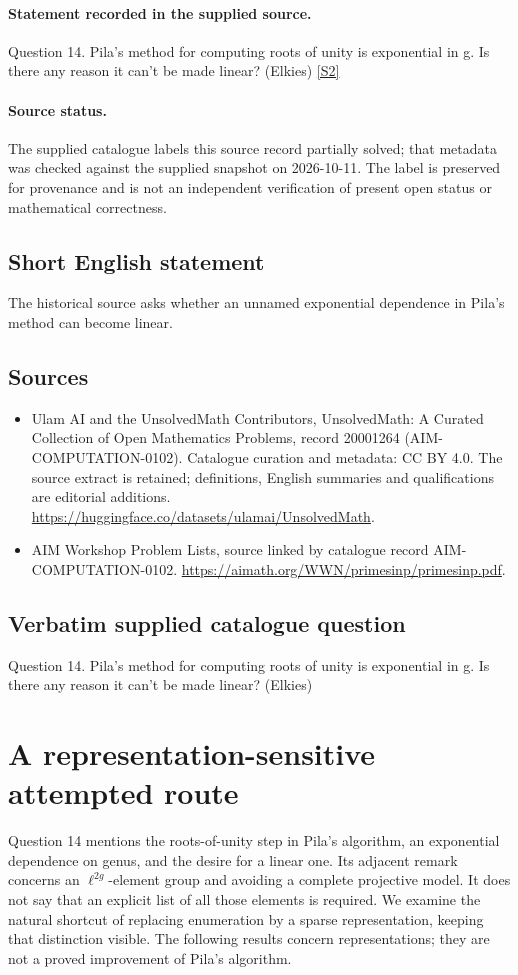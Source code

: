 \documentclass[11pt]{article}
\begin{document}
\paragraph{Statement recorded in the supplied source.}
Question 14. Pila's method for computing roots of unity is exponential in g. Is there any reason it can't be made linear? (Elkies) \href{https://aimath.org/WWN/primesinp/primesinp.pdf}{[S2]}
\paragraph{Source status.}
The supplied catalogue labels this source record partially solved; that metadata was checked against the supplied snapshot on 2026-10-11. The label is preserved for provenance and is not an independent verification of present open status or mathematical correctness.
\subsection{Short English statement}
The historical source asks whether an unnamed exponential dependence in Pila's method can become linear.
\subsection{Sources}
\begin{itemize}
\item[S1] Ulam AI and the UnsolvedMath Contributors, UnsolvedMath: A Curated Collection of Open Mathematics Problems, record 20001264 (AIM-COMPUTATION-0102). Catalogue curation and metadata: CC BY 4.0. The source extract is retained; definitions, English summaries and qualifications are editorial additions.
\url{https://huggingface.co/datasets/ulamai/UnsolvedMath}.
\item[S2] AIM Workshop Problem Lists, source linked by catalogue record AIM-COMPUTATION-0102.
\url{https://aimath.org/WWN/primesinp/primesinp.pdf}.
\end{itemize}
\subsection{Verbatim supplied catalogue question}
Question 14. Pila's method for computing roots of unity is exponential in g. Is there any reason it can't be made linear? (Elkies)

\section{A representation-sensitive attempted route}
Question 14 mentions the roots-of-unity step in Pila's algorithm,
an exponential dependence on genus, and the desire for a linear one.
Its adjacent remark concerns an $\ell^{2g}$-element group and avoiding
a complete projective model. It does not say that an explicit list
of all those elements is required. We examine the natural shortcut
of replacing enumeration by a sparse representation, keeping that
distinction visible. The following results concern representations;
they are not a proved improvement of Pila's algorithm.
\end{document}
